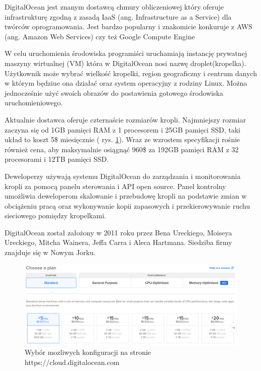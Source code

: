 

DigitalOcean jest znanym dostawcą chmury obliczeniowej który oferuje infrastrukturę zgodną z zasadą IaaS (ang. Infrastructure as a Service) dla twórców oprogramowania. Jest bardzo popularny i znakomicie konkuruje z AWS (ang. Amazon Web Services) czy też Google Compute Engine

W celu uruchomienia środowiska programiści uruchamiają instancję prywatnej maszyny wirtualnej (VM) która w DigitalOcean nosi nazwę droplet(kropelka). Użytkownik może wybrać wielkość kropelki, region geograficzny i centrum danych w którym będziue ona działać oraz system operacyjny z rodziny Linux.
Można jednocześnie użyć swoich obrazów do postawienia gotowego środowiska uruchomieniowego.

Aktualnie dostawca oferuje czternaście rozmiarów kropli. Najmniejszy rozmiar zaczyna się od 1GB pamięci RAM z 1 procesorem i 25GB pamięci SSD, taki układ to koszt 5\$ miesięcznie ( rys. \ref{fig:digitalocean}). Wraz ze wzrostem specyfikacji rośnie również cena, aby maksymalnie osiągnąć 960\$ za 192GB pamięci RAM z 32 procesorami i 12TB pamięci SSD.

Deweloperzy używają systemu DigitalOcean do zarządzania i monitorowania kropli za pomocą panelu sterowania i API open source. Panel kontrolny umożliwia deweloperom skalowanie i przebudowę kropli na podstawie zmian w obciążeniu pracą oraz wykonywanie kopii zapasowych i przekierowywanie ruchu sieciowego pomiędzy kropelkami.

DigitalOcean został założony w 2011 roku przez Bena Ureckiego, Moiseya Ureckiego, Mitcha Wainera, Jeffa Carra i Aleca Hartmana. Siedziba firmy znajduje się w Nowym Jorku.


\begin{figure}[!ht]
    \centering
    \includegraphics[width=6in]{images/digitalocean.png}
    \caption{Wybór mozliwych konfiguracji na stronie https://cloud.digitalocean.com \label{fig:digitalocean}}
\end{figure}